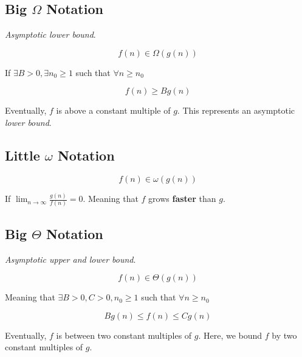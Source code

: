 \documentclass[12pt]{article}
\begin{document}
  


  \subsection{Big $\Omega$ Notation}
  {\it Asymptotic lower bound}.

  \[
    f(n) \in \Omega(g(n))
  \]

  If $\exists B > 0, \exists n_0 \ge 1$ such that $\forall n \ge n_0$

  \[
    f(n) \ge Bg(n)
  \]

  Eventually, $f$ is above a constant multiple of $g$. This represents an
  asymptotic {\it lower bound}.





  \subsection{Little $\omega$ Notation}

  \[
    f(n) \in \omega(g(n))
  \]

  If $\lim_{n \to \infty} \frac{g(n)}{f(n)} = 0$. Meaning that $f$ grows
  {\bf faster} than $g$.









  \subsection{Big $\Theta$ Notation}
  {\it Asymptotic upper and lower bound}.

  \[
    f(n) \in \Theta(g(n))
  \]

  Meaning that $\exists B > 0, C > 0, n_0 \ge 1$ such that $\forall n \ge n_0$

  \[
    Bg(n) \le f(n) \le Cg(n)
  \]

  Eventually, $f$ is between two constant multiples of $g$. Here, we bound $f$ by
  two constant multiples of $g$.


\end{document}

